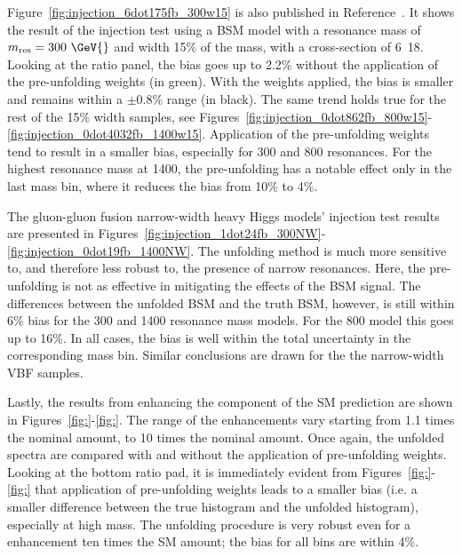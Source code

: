 Figure~\ref{fig:injection_6dot175fb_300w15} is also published in Reference~\cite{m4l2021_paper}. It shows the result of the injection test using a BSM model with a resonance mass of $m_{\mathrm{res}}=300~\GeV{}$ and width 15\% of the mass, with a cross-section of \unit{6.18}{\invfb}. Looking at the ratio panel, the bias goes up to 2.2\% without the application of the pre-unfolding weights (in green). With the weights applied, the bias is smaller and remains within a $\pm0.8\%$ range (in black). The same trend holds true for the rest of the 15\% width samples, see Figures~\ref{fig:injection_0dot862fb_800w15}-\ref{fig:injection_0dot4032fb_1400w15}. Application of the pre-unfolding weights tend to result in a smaller bias, especially for \unit{300}{\GeV} and \unit{800}{\GeV} resonances. For the highest resonance mass at \unit{1400}{\GeV}, the pre-unfolding has a notable effect only in the last \mFourL{} mass bin, where it reduces the bias from 10\% to 4\%.

The gluon-gluon fusion narrow-width heavy Higgs models' injection test results are presented in Figures~\ref{fig:injection_1dot24fb_300NW}-\ref{fig:injection_0dot19fb_1400NW}. The unfolding method is much more sensitive to, and therefore less robust to, the presence of narrow resonances. Here, the pre-unfolding is not as effective in mitigating the effects of the BSM signal. The differences between the unfolded BSM and the truth BSM, however, is still within 6\% bias for the \unit{300}{\GeV} and \unit{1400}{\GeV} resonance mass models. For the \unit{800}{\GeV} model this goes up to 16\%. In all cases, the bias is well within the total uncertainty in the corresponding \mFourL{} mass bin. Similar conclusions are drawn for the the narrow-width VBF samples. 

Lastly, the results from enhancing the \ggZZ component of the SM prediction are shown in Figures~\ref{fig:}-\ref{fig:}. The range of the enhancements vary starting from 1.1 times the nominal amount, to 10 times the nominal amount. Once again, the unfolded spectra are compared with and without the application of pre-unfolding weights. Looking at the bottom ratio pad, it is immediately evident from Figures~\ref{fig:}-\ref{fig:} that application of pre-unfolding weights leads to a smaller bias (i.e. a smaller difference between the true histogram and the unfolded histogram), especially at high mass. The unfolding procedure is very robust even for a \ggZZ enhancement ten times the SM amount; the bias for all bins are within 4\%.

